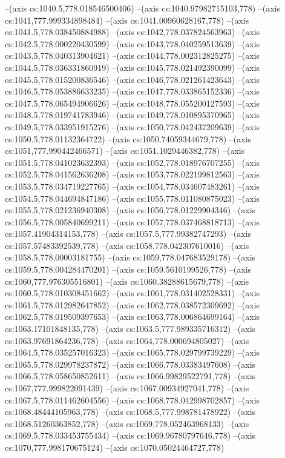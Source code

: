 --(axis cs:1040.5,778.018546500406)
--(axis cs:1040.97982715103,778)
--(axis cs:1041,777.999334898484)
--(axis cs:1041.00960628167,778)
--(axis cs:1041.5,778.038450884988)
--(axis cs:1042,778.037824563963)
--(axis cs:1042.5,778.000220430599)
--(axis cs:1043,778.040259513639)
--(axis cs:1043.5,778.040313904621)
--(axis cs:1044,778.002312825275)
--(axis cs:1044.5,778.036331860919)
--(axis cs:1045,778.021492390099)
--(axis cs:1045.5,778.015200836546)
--(axis cs:1046,778.021261423643)
--(axis cs:1046.5,778.053886633235)
--(axis cs:1047,778.033865152336)
--(axis cs:1047.5,778.065494906626)
--(axis cs:1048,778.055200127593)
--(axis cs:1048.5,778.019741783946)
--(axis cs:1049,778.010895370965)
--(axis cs:1049.5,778.033951915276)
--(axis cs:1050,778.042437209639)
--(axis cs:1050.5,778.01132364722)
--(axis cs:1050.74059344679,778)
--(axis cs:1051,777.990442466571)
--(axis cs:1051.1029446382,778)
--(axis cs:1051.5,778.041023632393)
--(axis cs:1052,778.018976707255)
--(axis cs:1052.5,778.041562636208)
--(axis cs:1053,778.022199812563)
--(axis cs:1053.5,778.034719227765)
--(axis cs:1054,778.034607483261)
--(axis cs:1054.5,778.044694847186)
--(axis cs:1055,778.011080875023)
--(axis cs:1055.5,778.021236940308)
--(axis cs:1056,778.01229904346)
--(axis cs:1056.5,778.005840699211)
--(axis cs:1057,778.037468818713)
--(axis cs:1057.41904314153,778)
--(axis cs:1057.5,777.99382747293)
--(axis cs:1057.57483392539,778)
--(axis cs:1058,778.042307610016)
--(axis cs:1058.5,778.00003181755)
--(axis cs:1059,778.047683529178)
--(axis cs:1059.5,778.004284470201)
--(axis cs:1059.5610199526,778)
--(axis cs:1060,777.976305516801)
--(axis cs:1060.38288615679,778)
--(axis cs:1060.5,778.010308451662)
--(axis cs:1061,778.031402528331)
--(axis cs:1061.5,778.012982647852)
--(axis cs:1062,778.038572309692)
--(axis cs:1062.5,778.019509397653)
--(axis cs:1063,778.006864699164)
--(axis cs:1063.17101848135,778)
--(axis cs:1063.5,777.989335716312)
--(axis cs:1063.97691864236,778)
--(axis cs:1064,778.000694805027)
--(axis cs:1064.5,778.035257016323)
--(axis cs:1065,778.029799739229)
--(axis cs:1065.5,778.029978237872)
--(axis cs:1066,778.03383497608)
--(axis cs:1066.5,778.058650852611)
--(axis cs:1066.99829522791,778)
--(axis cs:1067,777.999822091439)
--(axis cs:1067.00934927041,778)
--(axis cs:1067.5,778.011462604556)
--(axis cs:1068,778.042998702857)
--(axis cs:1068.48444105963,778)
--(axis cs:1068.5,777.998781478922)
--(axis cs:1068.51260363852,778)
--(axis cs:1069,778.052463968133)
--(axis cs:1069.5,778.033453755434)
--(axis cs:1069.96780797646,778)
--(axis cs:1070,777.998170675124)
--(axis cs:1070.05024464727,778)
